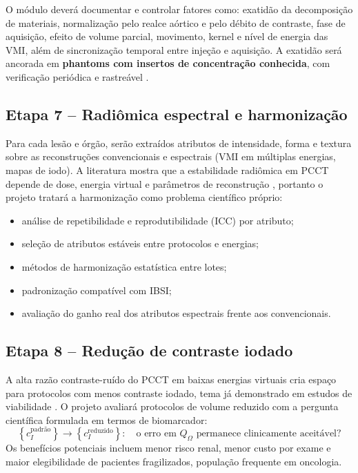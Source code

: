 \documentclass[11pt,a4paper]{article}
\begin{document}
O módulo deverá documentar e controlar fatores como: exatidão da decomposição de materiais, normalização pelo realce aórtico e pelo débito de contraste, fase de aquisição, efeito de volume parcial, movimento, kernel e nível de energia das VMI, além de sincronização temporal entre injeção e aquisição. A exatidão será ancorada em \textbf{phantoms com insertos de concentração conhecida}, com verificação periódica e rastreável \cite{liveriodine,schwartz}.

\subsection{Etapa 7 -- Radiômica espectral e harmonização}

Para cada lesão e órgão, serão extraídos atributos de intensidade, forma e textura sobre as reconstruções convencionais e espectrais (VMI em múltiplas energias, mapas de iodo). A literatura mostra que a estabilidade radiômica em PCCT depende de dose, energia virtual e parâmetros de reconstrução \cite{radiomics}, portanto o projeto tratará a harmonização como problema científico próprio:

\begin{itemize}
\item análise de repetibilidade e reprodutibilidade (ICC) por atributo;
\item seleção de atributos estáveis entre protocolos e energias;
\item métodos de harmonização estatística entre lotes;
\item padronização compatível com IBSI;
\item avaliação do ganho real dos atributos espectrais frente aos convencionais.
\end{itemize}

\subsection{Etapa 8 -- Redução de contraste iodado}

A alta razão contraste-ruído do PCCT em baixas energias virtuais cria espaço para protocolos com menos contraste iodado, tema já demonstrado em estudos de viabilidade \cite{contrastred}. O projeto avaliará protocolos de volume reduzido com a pergunta científica formulada em termos de biomarcador:
\begin{equation}
\left\{ c_{I}^{\text{padrão}} \right\} \longrightarrow \left\{ c_{I}^{\text{reduzido}} \right\}: \quad \text{o erro em } Q_{\Omega} \text{ permanece clinicamente aceitável?}
\end{equation}
Os benefícios potenciais incluem menor risco renal, menor custo por exame e maior elegibilidade de pacientes fragilizados, população frequente em oncologia.
\end{document}
